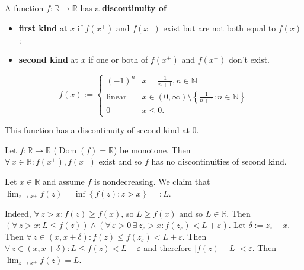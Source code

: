 \documentclass{notes}
\begin{document}
\begin{defn}
  A function $f \colon \mathbb R \to \mathbb R$ has a {\boldmath \bfseries discontinuity of }
  \begin{itemize}
    \item {\boldmath \bfseries first kind} at $x$ if $f(x^+)$ and $f(x^-)$ exist but are not both equal to $f(x)$;

    \item {\boldmath \bfseries second kind} at $x$ if one or both of $f(x^+)$ and $f(x^-)$ don't exist.
  \end{itemize}
\end{defn}

\newpage

\begin{eg}
  \[
    f(x) := \begin{cases}
      (-1)^n & x = \frac{1}{n + 1}, n \in \mathbb N \\ 
      \text{linear} & x \in (0, \infty) \setminus \left \{ \frac{1}{n + 1} : n \in \mathbb N \right \} \\ 
      0 & x \leq 0.
    \end{cases}
  \]
  
  
  This function has a discontinuity of second kind at 0.
\end{eg}

\begin{lem}
  Let $f \colon \mathbb R \to \mathbb R$ ($\operatorname{Dom}(f) = \mathbb R$) be monotone.
  Then $\forall \, x \in \mathbb R: \text{$f(x^+), f(x^-)$ exist}$ and so $f$ has no discontinuities of second kind.
\end{lem}

\begin{prf}
  Let $x \in \mathbb R$ and assume $f$ is nondecreasing.
  We claim that $\lim_{z \to x^+} f(z) = \inf \left \{ f(z) : z > x \right \}=: L$.

  Indeed, $\forall \, z > x: f(z) \geq f(x)$, so $L \geq f(x)$ and so $L \in \mathbb R$.
  Then $(\forall \, z > x: L \leq f(z)) \land (\forall \, \varepsilon > 0 \, \exists \, z_\varepsilon  > x: f(z_\varepsilon) < L + \varepsilon)$.
  Let $\delta := z_\varepsilon - x$.
  Then $\forall \, z \in (x, x + \delta): f(z) \leq f(z_\varepsilon) < L + \varepsilon$.
  Then $\forall \, z \in (x, x + \delta): L \leq f(z) < L + \varepsilon$ and therefore $\left | f(z) - L \right | < \varepsilon$.
  Then $\lim_{z \to x^+} f(z) = L$.
\end{prf}
\end{document}
